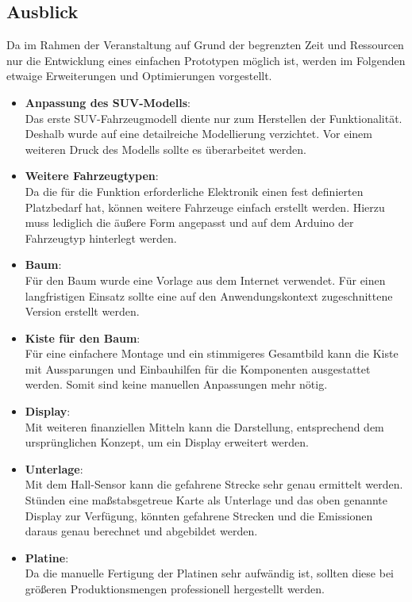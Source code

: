 \documentclass[.../Dokumentation.tex]{subfile}
\begin{document}
\subsection{Ausblick}\label{sec-outlook}
Da im Rahmen der Veranstaltung auf Grund der begrenzten Zeit und Ressourcen nur die Entwicklung eines einfachen Prototypen möglich ist, werden im Folgenden etwaige Erweiterungen und Optimierungen vorgestellt.
\begin{itemize}
	\item \textbf{Anpassung des SUV-Modells}:\\
	Das erste SUV-Fahrzeugmodell diente nur zum Herstellen der Funktionalität. 
	Deshalb wurde auf eine detailreiche Modellierung verzichtet. 
	Vor einem weiteren Druck des Modells sollte es überarbeitet werden.
	\item \textbf{Weitere Fahrzeugtypen}:\\
	Da die für die Funktion erforderliche Elektronik einen fest definierten 
	Platzbedarf hat, können weitere Fahrzeuge einfach erstellt werden. Hierzu 
	muss lediglich die äußere Form angepasst und auf dem Arduino der 
	Fahrzeugtyp hinterlegt werden. 
	\item \textbf{Baum}:\\
	Für den Baum wurde eine Vorlage aus dem Internet verwendet. Für einen 
	langfristigen Einsatz sollte eine auf den Anwendungskontext zugeschnittene 
	Version erstellt werden.
	\item \textbf{Kiste für den Baum}:\\
	Für eine einfachere Montage und ein stimmigeres Gesamtbild kann die Kiste 
	mit Aussparungen und Einbauhilfen für die Komponenten ausgestattet werden. 
	Somit sind keine manuellen Anpassungen mehr nötig.
	\item \textbf{Display}:\\
	Mit weiteren finanziellen Mitteln kann die Darstellung, entsprechend dem 
	ursprünglichen Konzept, um ein Display erweitert werden.
	\item \textbf{Unterlage}:\\
	Mit dem Hall-Sensor kann die gefahrene Strecke sehr genau ermittelt werden. 
	Stünden eine maßstabsgetreue Karte als Unterlage und das oben genannte 
	Display zur Verfügung, könnten gefahrene Strecken und die Emissionen daraus
	genau berechnet und abgebildet werden.
	\item \textbf{Platine}:\\
	Da die manuelle Fertigung der Platinen sehr aufwändig ist, sollten diese 
	bei größeren Produktionsmengen professionell hergestellt werden.
\end{itemize}
   
\end{document}
